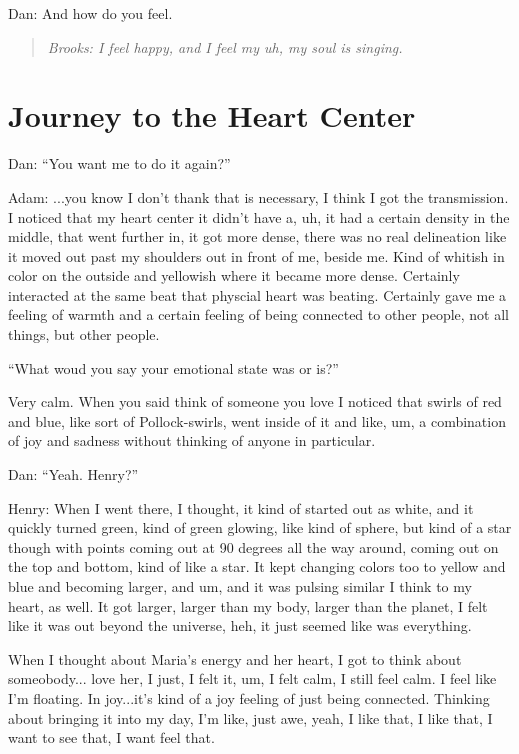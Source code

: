 \documentclass[12pt]{book}
\begin{document}
Dan: And how do you feel.

\begin{quote}{\em
Brooks: I feel happy, and I feel my uh, my soul is singing.
}\end{quote}    

\section{Journey to the Heart Center}

Dan: ``You want me to do it again?''

Adam: ...you know I don't thank that is necessary, I think I got the transmission.
I noticed that my heart center it didn't have a, uh, it had a
certain density in the middle, that went further in, it got more dense,
there was no real delineation like it moved out past my shoulders
out in front of me, beside me.
Kind of whitish in color on the outside and yellowish where it became more
dense. Certainly interacted at the same beat that physcial heart was
beating. Certainly gave me a feeling of warmth and a certain feeling of being
connected to other people, not all things, but other people.

``What woud you say your emotional state was or is?''

Very calm. When you said think of someone you love I noticed
that swirls of red and blue, like sort of Pollock-swirls,
went inside of it and like, um, a combination of joy and
sadness without thinking of anyone in particular.

Dan: ``Yeah. Henry?''

Henry: When I went there, I thought, it kind of started out as white,
and it quickly turned green, kind of green glowing, like kind
of sphere, but kind of a star though with points coming out at
90 degrees all the way around,  coming out on the top and bottom, kind of like a star.
It kept changing colors too to yellow and blue and becoming larger, and um,
and it was pulsing similar I think to my heart, as well. It got larger,
larger than my body, larger than the planet, I felt like it was out
beyond the universe, heh, it just seemed like was everything.

When I thought about Maria's energy and her heart, I got to think about someobody...
love her, I just,  I felt it, um, I felt calm, I still feel calm. I feel like I'm floating.
In joy...it's kind of a joy feeling of just being connected. Thinking about bringing it
into my day, I'm like, just awe, yeah, I like that, I like that, I want to see that, I want feel that.
\end{document}

